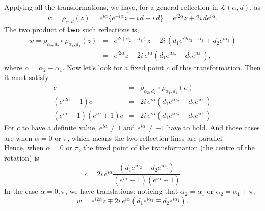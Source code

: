\documentclass{article}
\begin{document}
Applying all the transformations, we have, for a general reflection in $\mathcal{L}(\alpha, d)$, as
\begin{equation}
w = \rho_{\alpha,d} (z) = e^{i\alpha}\{ \overline{e^{-i\alpha} z - i\,d} + i\,d \} = e^{i2\alpha} \bar{z} + 2i \, de^{i\alpha}.
\end{equation}
The two product of \textbf{two} such reflections is,
\begin{eqnarray}
w = \rho_{\alpha_{2}, d_{2}} \circ \rho_{\alpha_{1},d_{1}} (z) &=& e^{i2(\alpha_{2} - \alpha_{1})} z - 2i \, ( d_{1} e^{i2\alpha_{2} - \alpha_{1}} + d_{2} e^{i\alpha_{2}})  \nonumber \\
&=& e^{i2\alpha} z - 2i \, e^{i\alpha}( d_{1} e^{i\alpha_{2}} - d_{2} e^{i\alpha_{1}}),
\end{eqnarray}
where $\alpha = \alpha_{2} - \alpha_{1}$. Now let's look for a fixed point $c$ of this transformation. Then it must satisfy
\begin{eqnarray}
c &=&  \rho_{\alpha_{2}, d_{2}} \circ \rho_{\alpha_{1},d_{1}} (c) \nonumber \\
(e^{i2\alpha} - 1)c &=&  2i \, e^{i\alpha}( d_{1} e^{i\alpha_{2}} - d_{2} e^{i\alpha_{1}}) \nonumber  \\
(e^{i\alpha} - 1)(e^{i\alpha} + 1)c &=&  2i \, e^{i\alpha}( d_{1} e^{i\alpha_{2}} - d_{2} e^{i\alpha_{1}}) \nonumber 
\end{eqnarray}
For $c$ to have a definite value, $e^{i\alpha} \ne 1$  and $e^{i\alpha} \ne -1$ have to hold. And those cases are when $\alpha = 0$ or $\pi$, which means the two reflection lines are parallel.\\
Hence, when $\alpha = 0$ or $\pi$, the fixed point of the transformation (the centre of the rotation) is
\begin{equation}
c =  2i \, e^{i\alpha}\frac{( d_{1} e^{i\alpha_{2}} - d_{2} e^{i\alpha_{1}}) }{(e^{i\alpha} - 1)(e^{i\alpha} + 1)} \nonumber 
\end{equation}
In the case $\alpha = 0, \pi$, we have translations: noticing that $\alpha_{2} = \alpha_{1}$ or $\alpha_{2} = \alpha_{1} + \pi$,
\begin{equation}
w = e^{i2\alpha} z \mp 2i \, e^{i\alpha}( d_{1} e^{i\alpha_{2}} \mp d_{2} e^{i\alpha_{1}}).
\end{equation}
\end{document}
